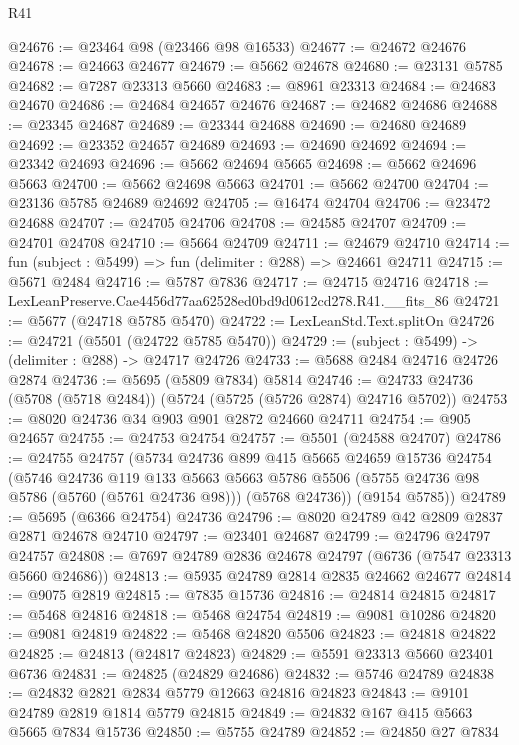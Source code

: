 \begin{lexlean}{R41}
\begin{coremodule}
@24676 := @23464 @98 (@23466 @98 @16533)
@24677 := @24672 @24676
@24678 := @24663 @24677
@24679 := @5662 @24678
@24680 := @23131 @5785
@24682 := @7287 @23313 @5660
@24683 := @8961 @23313
@24684 := @24683 @24670
@24686 := @24684 @24657 @24676
@24687 := @24682 @24686
@24688 := @23345 @24687
@24689 := @23344 @24688
@24690 := @24680 @24689
@24692 := @23352 @24657 @24689
@24693 := @24690 @24692
@24694 := @23342 @24693
@24696 := @5662 @24694 @5665
@24698 := @5662 @24696 @5663
@24700 := @5662 @24698 @5663
@24701 := @5662 @24700
@24704 := @23136 @5785 @24689 @24692
@24705 := @16474 @24704
@24706 := @23472 @24688
@24707 := @24705 @24706
@24708 := @24585 @24707
@24709 := @24701 @24708
@24710 := @5664 @24709
@24711 := @24679 @24710
@24714 := fun (subject : @5499) => fun (delimiter : @288) => @24661 @24711
@24715 := @5671 @2484
@24716 := @5787 @7836
@24717 := @24715 @24716
@24718 := LexLeanPreserve.Cae4456d77aa62528ed0bd9d0612cd278.R41.__fits_86
@24721 := @5677 (@24718 @5785 @5470)
@24722 := LexLeanStd.Text.splitOn
@24726 := @24721 (@5501 (@24722 @5785 @5470))
@24729 := (subject : @5499) -> (delimiter : @288) -> @24717 @24726
@24733 := @5688 @2484 @24716 @24726 @2874
@24736 := @5695 (@5809 @7834) @5814
@24746 := @24733 @24736 (@5708 (@5718 @2484)) (@5724 (@5725 (@5726 @2874) @24716 @5702))
@24753 := @8020 @24736 @34 @903 @901 @2872 @24660 @24711
@24754 := @905 @24657
@24755 := @24753 @24754
@24757 := @5501 (@24588 @24707)
@24786 := @24755
    @24757
    (@5734
      @24736
      @899
      @415
      @5665
      @24659
      @15736
      @24754
      (@5746
        @24736
        @119
        @133
        @5663
        @5663
        @5786
        @5506
        (@5755 @24736 @98 @5786 (@5760 (@5761 @24736 @98)))
        (@5768 @24736))
      (@9154 @5785))
@24789 := @5695 (@6366 @24754) @24736
@24796 := @8020 @24789 @42 @2809 @2837 @2871 @24678 @24710
@24797 := @23401 @24687
@24799 := @24796 @24797 @24757
@24808 := @7697 @24789 @2836 @24678 @24797 (@6736 (@7547 @23313 @5660 @24686))
@24813 := @5935 @24789 @2814 @2835 @24662 @24677
@24814 := @9075 @2819
@24815 := @7835 @15736
@24816 := @24814 @24815
@24817 := @5468 @24816
@24818 := @5468 @24754
@24819 := @9081 @10286
@24820 := @9081 @24819
@24822 := @5468 @24820 @5506
@24823 := @24818 @24822
@24825 := @24813 (@24817 @24823)
@24829 := @5591 @23313 @5660 @23401 @6736
@24831 := @24825 (@24829 @24686)
@24832 := @5746 @24789
@24838 := @24832 @2821 @2834 @5779 @12663 @24816 @24823
@24843 := @9101 @24789 @2819 @1814 @5779 @24815
@24849 := @24832 @167 @415 @5663 @5665 @7834 @15736
@24850 := @5755 @24789
@24852 := @24850 @27 @7834

\end{coremodule}
\end{lexlean}
